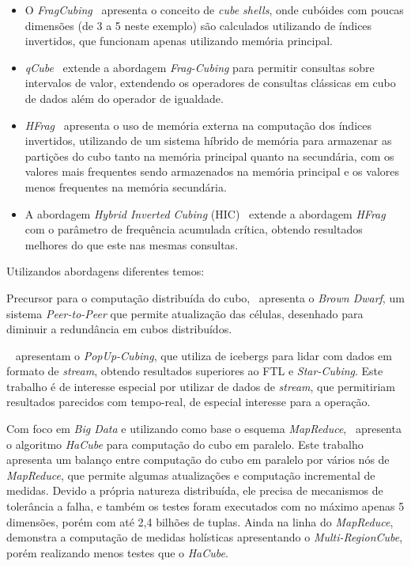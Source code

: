 \begin{itemize}
	\item O \textit{FragCubing}~\cite{liHighdimensionalOLAPMinimal2004} apresenta o conceito de \textit{cube shells}, onde cubóides com poucas dimensões (de 3 a 5 neste exemplo) são calculados utilizando de índices invertidos, que funcionam apenas utilizando memória principal.
	\item \textit{qCube}~\cite{silvaQCubeEfficientIntegration2013} extende a abordagem \textit{Frag-Cubing} para permitir consultas sobre intervalos de valor, extendendo os operadores de consultas clássicas em cubo de dados além do operador de igualdade.
	\item \textit{HFrag}~\cite{silvaHybridMemoryData2015} apresenta o uso de memória externa na computação dos índices invertidos, utilizando de um sistema híbrido de memória para armazenar as partições do cubo tanto na memória principal quanto na secundária, com os valores mais frequentes sendo armazenados na memória principal e os valores menos frequentes na memória secundária.

	\item A abordagem \textit{Hybrid Inverted Cubing} (HIC)~\cite{silvaComputingBIGData2016} extende a abordagem \textit{HFrag} com o parâmetro de frequência acumulada crítica, obtendo resultados melhores do que este nas mesmas consultas.
\end{itemize}

Utilizandos abordagens diferentes temos:

Precursor para o computação distribuída do cubo,~\cite{dokaBrownDwarfFullydistributed2011} apresenta o \textit{Brown Dwarf}, um sistema \textit{Peer-to-Peer} que permite atualização das células, desenhado para diminuir a redundância em cubos distribuídos.

~\cite{heinePopUpCubingAlgorithmEfficiently2017} apresentam o \textit{PopUp-Cubing}, que utiliza de icebergs para lidar com dados em formato de \textit{stream}, obtendo resultados superiores ao FTL e \textit{Star-Cubing}.
Este trabalho é de interesse especial por utilizar de dados de \textit{stream}, que permitiriam resultados parecidos com tempo-real, de especial interesse para a operação.

Com foco em \textit{Big Data} e utilizando como base o esquema \textit{MapReduce},~\cite{wangScalableDataCube2013} apresenta o algoritmo \textit{HaCube} para computação do cubo em paralelo.
Este trabalho apresenta um balanço entre computação do cubo em paralelo por vários nós de \textit{MapReduce}, que permite algumas atualizações e computação incremental de medidas.
Devido a própria natureza distribuída, ele precisa de mecanismos de tolerância a falha, e também os testes foram executados com no máximo apenas 5 dimensões, porém com até 2,4 bilhões de tuplas.
Ainda na linha do \textit{MapReduce},~\cite{yangHolisticAlgebraicData2017} demonstra a computação de medidas holísticas apresentando o \textit{Multi-RegionCube}, porém realizando menos testes que o \textit{HaCube}.

